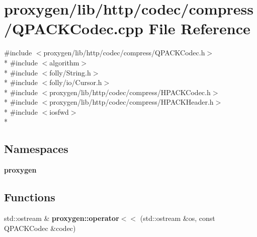\section{proxygen/lib/http/codec/compress/\+Q\+P\+A\+C\+K\+Codec.cpp File Reference}
\label{QPACKCodec_8cpp}
{\ttfamily \#include $<$proxygen/lib/http/codec/compress/\+Q\+P\+A\+C\+K\+Codec.\+h$>$}\\*
{\ttfamily \#include $<$algorithm$>$}\\*
{\ttfamily \#include $<$folly/\+String.\+h$>$}\\*
{\ttfamily \#include $<$folly/io/\+Cursor.\+h$>$}\\*
{\ttfamily \#include $<$proxygen/lib/http/codec/compress/\+H\+P\+A\+C\+K\+Codec.\+h$>$}\\*
{\ttfamily \#include $<$proxygen/lib/http/codec/compress/\+H\+P\+A\+C\+K\+Header.\+h$>$}\\*
{\ttfamily \#include $<$iosfwd$>$}\\*
\subsection*{Namespaces}
\begin{DoxyCompactItemize}
\item 
 {\bf proxygen}
\end{DoxyCompactItemize}
\subsection*{Functions}
\begin{DoxyCompactItemize}
\item 
std\+::ostream \& {\bf proxygen\+::operator$<$$<$} (std\+::ostream \&os, const Q\+P\+A\+C\+K\+Codec \&codec)
\end{DoxyCompactItemize}
